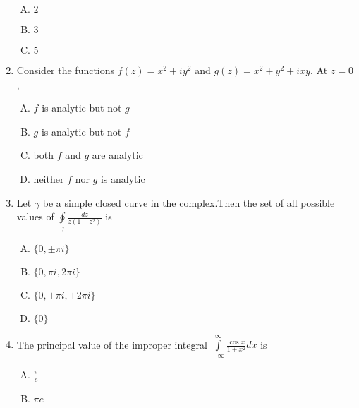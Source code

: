 \documentclass[12pt,a4paper]{article}
\begin{document}
\begin{enumerate}
\begin{enumerate}[(A)]
\item $
2
$

\item $
3
$

\item $
5
$

\end{enumerate}


\item Consider the functions $f(z)=x^2+i y^2$ and $g(z)=x^2+y^2+ i x y$. At $z=0$,

\begin{enumerate}[(A)]

\item
$f$ is analytic but not $g$

\item
$g$ is analytic but not $f$

\item
both $f$ and $g$ are analytic

\item
neither $f$ nor $g$ is analytic


\end{enumerate}


\item Let $\gamma$ be a simple closed curve in the complex.Then the set of all possible values of
$\oint\limits_{\gamma} \frac{dz}{z(1-z^2)}$ is

\begin{enumerate}[(A)]

\item $
\lbrace 0, \pm \pi i \rbrace
$

\item $
\lbrace 0, \pi i, 2 \pi i \rbrace
$

\item $
\lbrace 0, \pm \pi i, \pm 2 \pi i \rbrace
$

\item $
\lbrace 0 \rbrace
$


\end{enumerate}


\item The principal value of the improper integral $\int\limits_{-\infty}^{\infty} \frac{\cos x}{1+x^2} dx $ is

\begin{enumerate}[(A)]

\item $
\frac{\pi}{e}
$

\item $
\pi e
$


\end{enumerate}
\end{enumerate}
\end{document}
